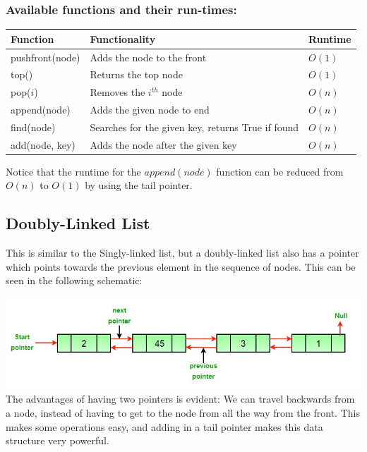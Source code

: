 \documentclass{article}
\theoremstyle{definition}
\theoremstyle{example}
\begin{document}
\subsubsection*{\Large Available functions and their run-times:}
\vspace{-2mm}
\begin{center}
 \begin{tabular}{| m{9em} | m{15em} | m{4.5em} |} 
 \hline
 \textbf{Function} & \textbf{Functionality} & \textbf{Runtime}\\ [0.5ex] 
 \hline
 pushfront(node) & Adds the node to the front & $O(1)$ \\ 
 \hline
 top() & Returns the top node & $O(1)$ \\
 \hline
 pop($i$) & Removes the $i^{th}$ node & $O(n)$ \\
 \hline
 append(node) & Adds the given node to end & $O(n)$ \\
 \hline
 find(node) & Searches for the given key, returns True if found & $O(n)$ \\ [1ex] 
 \hline
 add(node, key) & Adds the node after the given key & $O(n)$ \\
 \hline
\end{tabular}
\end{center}
\vspace{3mm}
Notice that the runtime for the $append(node)$ function can be reduced from $O(n)$ to $O(1)$ by using the tail pointer.
\subsection{\Large Doubly-Linked List}
\hspace{4mm}This is similar to the Singly-linked list, but a doubly-linked list also has a pointer which points towards the previous element in the sequence of nodes. This can be seen in the following schematic:\par
\vspace{2mm}
\includegraphics[scale = 0.7]{dll.jpg}
\vspace{2mm}
The advantages of having two pointers is evident: We can travel backwards from a node, instead of having to get to the node from all the way from the front. This makes some operations easy, and adding in a tail pointer makes this data structure very powerful.
\newpage
\end{document}
